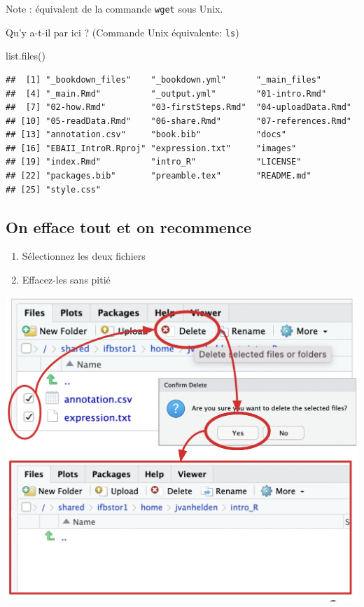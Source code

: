 \documentclass[
]{book}
\newenvironment{Shaded}{\begin{snugshade}}{\end{snugshade}}
\newcommand{\FunctionTok}[1]{\textcolor[rgb]{0.00,0.00,0.00}{#1}}
\newcommand{\NormalTok}[1]{#1}
\providecommand{\tightlist}{%
  \setlength{\itemsep}{0pt}\setlength{\parskip}{0pt}}
\begin{document}
Note : équivalent de la commande \texttt{wget} sous Unix.

Qu'y a-t-il par ici ? (Commande Unix équivalente: \texttt{ls})

\begin{Shaded}
\begin{Highlighting}[]
\FunctionTok{list.files}\NormalTok{()}
\end{Highlighting}
\end{Shaded}

\begin{verbatim}
##  [1] "_bookdown_files"    "_bookdown.yml"      "_main_files"       
##  [4] "_main.Rmd"          "_output.yml"        "01-intro.Rmd"      
##  [7] "02-how.Rmd"         "03-firstSteps.Rmd"  "04-uploadData.Rmd" 
## [10] "05-readData.Rmd"    "06-share.Rmd"       "07-references.Rmd" 
## [13] "annotation.csv"     "book.bib"           "docs"              
## [16] "EBAII_IntroR.Rproj" "expression.txt"     "images"            
## [19] "index.Rmd"          "intro_R"            "LICENSE"           
## [22] "packages.bib"       "preamble.tex"       "README.md"         
## [25] "style.css"
\end{verbatim}

\hypertarget{on-efface-tout-et-on-recommence-1}{%
\subsection{On efface tout et on recommence}\label{on-efface-tout-et-on-recommence-1}}

\begin{enumerate}
\def\labelenumi{\arabic{enumi}.}
\tightlist
\item
  Sélectionnez les deux fichiers
\item
  Effacez-les sans pitié
\end{enumerate}

\includegraphics{images/delete.png}
\end{document}
